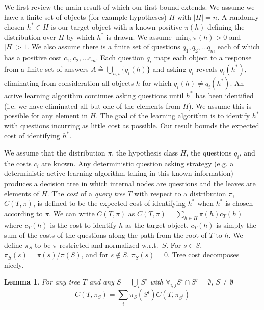 \documentclass{article}
\newtheorem{lemma}{Lemma}
\begin{document}
We first review the main result of \citet{greedy} which our first
bound extends.  We assume we have a finite set of objects (for example
hypotheses) $H$ with $|H|=n$.  A randomly chosen $h^* \in H$ is our
target object with a known positive $\pi(h)$ defining the
distribution over $H$ by which $h^*$ is drawn.  We assume $\min_h
\pi(h) > 0$ and $|H|>1$.  We also assume there is a finite set of
questions $q_1, q_2, ... q_m$ each of which has a positive cost $c_1,
c_2,... c_m$.  Each question $q_i$ maps each object to a response from
a finite set of answers $A \triangleq \bigcup_{h,i} \{ q_i(h) \}$
and asking $q_i$ reveals $q_i(h^*)$, eliminating from consideration
all objects $h$ for which $q_i(h) \neq q_i(h^*)$.  An active learning
algorithm continues asking questions until $h^*$ has been identified
(i.e. we have eliminated all but one of the elements from $H$).  We
assume this is possible for any element in $H$.  The goal of the
learning algorithm is to identify $h^*$ with questions incurring as
little cost as possible.  Our result bounds the expected cost of
identifying $h^*$.

We assume that the distribution $\pi$, the hypothesis class $H$, the
questions $q_i$, and the costs $c_i$ are known.  Any deterministic
question asking strategy (e.g. a deterministic active learning
algorithm taking in this known information) produces a decision tree
in which internal nodes are questions and the leaves are elements of
$H$.  The \emph{cost} of a \emph{query tree} $T$ with respect to a
distribution $\pi$, $C(T, \pi)$, is defined to be the expected cost of
identifying $h^*$ when $h^*$ is chosen according to $\pi$.  We can
write $C(T, \pi)$ as $C(T, \pi) = \sum_{h \in H} \pi(h) c_T(h)$ where
$c_T(h)$ is the cost to identify $h$ as the target object.  $c_T(h)$
is simply the sum of the costs of the questions along the path from
the root of $T$ to $h$.  We define $\pi_S$ to be $\pi$ restricted and
normalized w.r.t.\ $S$.  For $s \in S$, $\pi_S(s) = \pi(s) / \pi(S)$,
and for $s \notin S$, $\pi_S(s) = 0$.  Tree cost decomposes nicely.
\begin{lemma}
For any tree $T$ and any $S = \bigcup_{i} S^i$ with 
$\forall_{i,j} S^i \cap S^j = \emptyset$, $S \neq \emptyset$
\[ C(T, \pi_S) = \sum_{i} \pi_S(S^i) C(T, \pi_{S^i}) \]
\label{decomplem}
\end{lemma}
\end{document}
